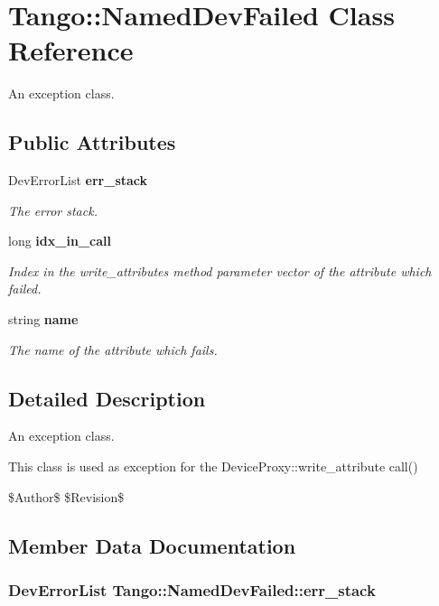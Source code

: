 \section{Tango\-:\-:Named\-Dev\-Failed Class Reference}
\label{classTango_1_1NamedDevFailed}


An exception class.  


\subsection*{Public Attributes}
\begin{DoxyCompactItemize}
\item 
Dev\-Error\-List {\bf err\-\_\-stack}
\begin{DoxyCompactList}\small\item\em The error stack. \end{DoxyCompactList}\item 
long {\bf idx\-\_\-in\-\_\-call}
\begin{DoxyCompactList}\small\item\em Index in the write\-\_\-attributes method parameter vector of the attribute which failed. \end{DoxyCompactList}\item 
string {\bf name}
\begin{DoxyCompactList}\small\item\em The name of the attribute which fails. \end{DoxyCompactList}\end{DoxyCompactItemize}


\subsection{Detailed Description}
An exception class. 

This class is used as exception for the Device\-Proxy\-::write\-\_\-attribute call()

\$\-Author\$ \$\-Revision\$ 

\subsection{Member Data Documentation}
\subsubsection[{err\-\_\-stack}]{\setlength{\rightskip}{0pt plus 5cm}Dev\-Error\-List Tango\-::\-Named\-Dev\-Failed\-::err\-\_\-stack}\label{classTango_1_1NamedDevFailed_ab24a8e7c1a1a7b20e6361e85d5d4c20a}



